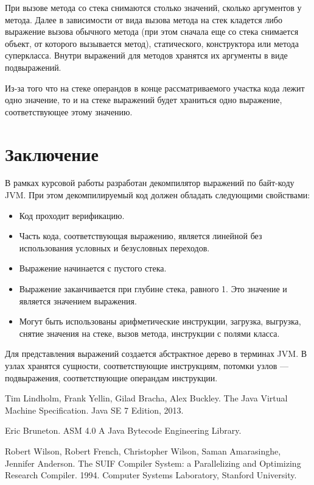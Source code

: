 При вызове метода со стека снимаются столько значений, сколько аргументов у метода. Далее в зависимости от вида вызова метода на стек кладется либо выражение вызова обычного метода (при этом сначала еще со стека снимается объект, от которого вызывается метод), статического, конструктора или метода суперкласса. Внутри выражений для методов хранятся их аргументы в виде подвыражений.

Из-за того что на стеке операндов в конце рассматриваемого участка кода лежит одно значение, то и на стеке выражений будет храниться одно выражение, соответствующее этому значению.

\section*{Заключение}

В рамках курсовой работы разработан декомпилятор выражений по байт-коду JVM. При этом декомпилируемый код должен обладать следующими свойствами:
\begin{itemize}
\item Код проходит верификацию.
\item Часть кода, соответствующая выражению, является линейной без использования условных и безусловных переходов.
\item Выражение начинается с пустого стека.
\item Выражение заканчивается при глубине стека, равного 1. Это значение и является значением выражения.
\item Могут быть использованы арифметические инструкции, загрузка, выгрузка, снятие значения на стеке, вызов метода, инструкции с полями класса. 
\end{itemize}
Для представления выражений создается абстрактное дерево в терминах JVM. В узлах хранятся сущности, соответствующие инструкциям, потомки узлов --- подвыражения, соответствующие операндам инструкции.

\begin{thebibliography}{99}
Tim Lindholm, Frank Yellin, Gilad Bracha, Alex Buckley.
The Java Virtual Machine Specification.
Java SE 7 Edition, 2013.

Eric Bruneton.
ASM 4.0 A Java Bytecode Engineering Library.

Robert Wilson, Robert French, Christopher Wilson, Saman Amarasinghe, Jennifer Anderson. The SUIF Compiler System: a Parallelizing and Optimizing Research Compiler. 1994. Computer Systems Laboratory, Stanford University.
\end{thebibliography}
